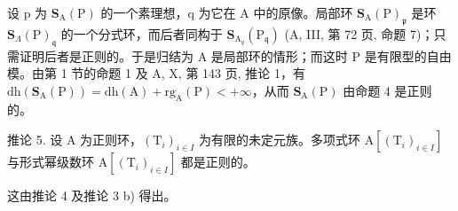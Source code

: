 设 p 为 \(\mathbf{S}_{\mathrm{A}}(\mathrm{P})\) 的一个素理想，q 为它在 A 中的原像。局部环 \(\mathbf{S}_{\mathrm{A}}(\mathrm{P})_{\mathfrak{p}}\) 是环 \(\mathbf{S}_{\Lambda}(\mathrm{P})_{\mathfrak{q}}\) 的一个分式环，而后者同构于 \(\mathbf{S}_{\mathrm{A}_{q}}(\mathrm{P}_{\mathfrak{q}})\) (A, III, 第 72 页, 命题 7)；只需证明后者是正则的。于是归结为 A 是局部环的情形；而这时 P 是有限型的自由模。由第 1 节的命题 1 及 A, X, 第 143 页, 推论 1，有 \(\mathrm{dh}(\mathbf{S}_{\mathrm{A}}(\mathrm{P})) = \mathrm{dh}(\mathrm{A}) + \mathrm{rg}_{\mathrm{A}}(\mathrm{P}) < +\infty\)，从而 \(\mathbf{S}_{\mathrm{A}}(\mathrm{P})\) 由命题 4 是正则的。

推论 5. 设 A 为正则环，\((\mathrm{T}_i)_{i\in I}\) 为有限的未定元族。多项式环 \(\mathrm{A}[(\mathrm{T}_i)_{i\in I}]\) 与形式幂级数环 \(\mathrm{A}[(\mathrm{T}_i)_{i\in I}]\) 都是正则的。

这由推论 4 及推论 3 b) 得出。

